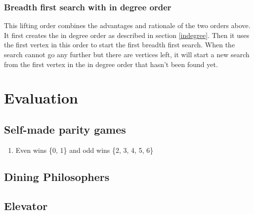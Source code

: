 \documentclass[10pt,a4paper]{article}
\begin{document}
\subsubsection{Breadth first search with in degree order}
This lifting order combines the advantages and rationale of the two orders above. It first creates the in degree order as described in section \ref{indegree}. Then it uses the first vertex in this order to start the first breadth first search. When the search cannot go any further but there are vertices left, it will start a new search from the first vertex in the in degree order that hasn't been found yet.

\section{Evaluation}\label{eval}

\subsection{Self-made parity games}

\begin{enumerate}[Game01]
	\item Even wins \{0, 1\} and odd wins \{2, 3, 4, 5, 6\}
\end{enumerate}

\subsection{Dining Philosophers}


\subsection{Elevator}
\end{document}

